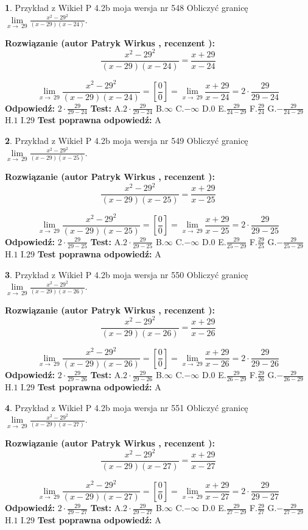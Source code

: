 \documentclass[12pt, a4paper]{article}
\theoremstyle{definition} %
\newtheorem{zad}{}
\newcommand{\zadStart}[1]{\begin{zad}#1\newline}
\newcommand{\zadStop}{\end{zad}}
\newcommand{\rozwStart}[2]{\noindent \textbf{Rozwiązanie (autor #1 , recenzent #2): }\newline}
\newcommand{\rozwStop}{\newline}
\newcommand{\odpStart}{\noindent \textbf{Odpowiedź:}\newline}
\newcommand{\odpStop}{\newline}
\newcommand{\testStart}{\noindent \textbf{Test:}\newline}
\newcommand{\testStop}{\newline}
\newcommand{\kluczStart}{\noindent \textbf{Test poprawna odpowiedź:}\newline}
\newcommand{\kluczStop}{\newline}
\begin{document}
\zadStart{Przykład z Wikieł P 4.2b moja wersja nr 548}
Obliczyć granicę $\lim\limits_{x\to\ 29}\frac{x^{2}-29^{2}}{(x-29)(x-24)}$.
\zadStop
\rozwStart{Patryk Wirkus}{}
$$\frac{x^{2}-29^{2}}{(x-29)(x-24)}=\frac{x+29}{x-24}$$

$$\lim\limits_{x\to\ 29}\frac{x^{2}-29^{2}}{(x-29)(x-24)}=[\frac{0}{0}]=\lim\limits_{x\to\ 29}\frac{x+29}{x-24}=2 \cdot \frac{29}{29-24}$$
\rozwStop
\odpStart
$2 \cdot \frac{29}{29-24}$
\odpStop
\testStart
A.$2 \cdot \frac{29}{29-24}$
B.$\infty$
C.$-\infty$
D.$0$
E.$\frac{29}{24-29}$
F.$\frac{29}{24}$
G.$-\frac{29}{24-29}$
H.$1$
I.$29$
\testStop
\kluczStart
A
\kluczStop



\zadStart{Przykład z Wikieł P 4.2b moja wersja nr 549}
Obliczyć granicę $\lim\limits_{x\to\ 29}\frac{x^{2}-29^{2}}{(x-29)(x-25)}$.
\zadStop
\rozwStart{Patryk Wirkus}{}
$$\frac{x^{2}-29^{2}}{(x-29)(x-25)}=\frac{x+29}{x-25}$$

$$\lim\limits_{x\to\ 29}\frac{x^{2}-29^{2}}{(x-29)(x-25)}=[\frac{0}{0}]=\lim\limits_{x\to\ 29}\frac{x+29}{x-25}=2 \cdot \frac{29}{29-25}$$
\rozwStop
\odpStart
$2 \cdot \frac{29}{29-25}$
\odpStop
\testStart
A.$2 \cdot \frac{29}{29-25}$
B.$\infty$
C.$-\infty$
D.$0$
E.$\frac{29}{25-29}$
F.$\frac{29}{25}$
G.$-\frac{29}{25-29}$
H.$1$
I.$29$
\testStop
\kluczStart
A
\kluczStop



\zadStart{Przykład z Wikieł P 4.2b moja wersja nr 550}
Obliczyć granicę $\lim\limits_{x\to\ 29}\frac{x^{2}-29^{2}}{(x-29)(x-26)}$.
\zadStop
\rozwStart{Patryk Wirkus}{}
$$\frac{x^{2}-29^{2}}{(x-29)(x-26)}=\frac{x+29}{x-26}$$

$$\lim\limits_{x\to\ 29}\frac{x^{2}-29^{2}}{(x-29)(x-26)}=[\frac{0}{0}]=\lim\limits_{x\to\ 29}\frac{x+29}{x-26}=2 \cdot \frac{29}{29-26}$$
\rozwStop
\odpStart
$2 \cdot \frac{29}{29-26}$
\odpStop
\testStart
A.$2 \cdot \frac{29}{29-26}$
B.$\infty$
C.$-\infty$
D.$0$
E.$\frac{29}{26-29}$
F.$\frac{29}{26}$
G.$-\frac{29}{26-29}$
H.$1$
I.$29$
\testStop
\kluczStart
A
\kluczStop



\zadStart{Przykład z Wikieł P 4.2b moja wersja nr 551}
Obliczyć granicę $\lim\limits_{x\to\ 29}\frac{x^{2}-29^{2}}{(x-29)(x-27)}$.
\zadStop
\rozwStart{Patryk Wirkus}{}
$$\frac{x^{2}-29^{2}}{(x-29)(x-27)}=\frac{x+29}{x-27}$$

$$\lim\limits_{x\to\ 29}\frac{x^{2}-29^{2}}{(x-29)(x-27)}=[\frac{0}{0}]=\lim\limits_{x\to\ 29}\frac{x+29}{x-27}=2 \cdot \frac{29}{29-27}$$
\rozwStop
\odpStart
$2 \cdot \frac{29}{29-27}$
\odpStop
\testStart
A.$2 \cdot \frac{29}{29-27}$
B.$\infty$
C.$-\infty$
D.$0$
E.$\frac{29}{27-29}$
F.$\frac{29}{27}$
G.$-\frac{29}{27-29}$
H.$1$
I.$29$
\testStop
\kluczStart
A
\kluczStop
\end{document}

